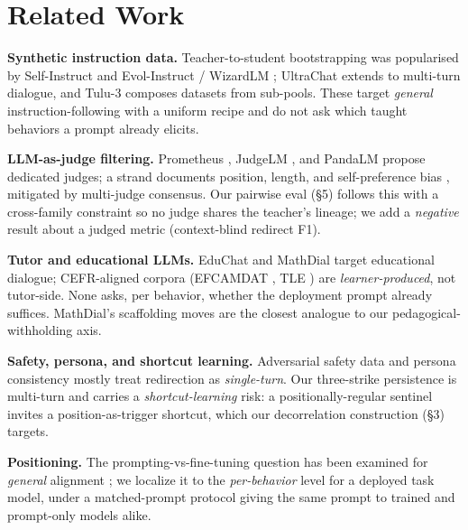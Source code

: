 \section{Related Work}\label{related-work}

\textbf{Synthetic instruction data.} Teacher-to-student bootstrapping
was popularised by Self-Instruct \citep{wang2023selfinstruct} and
Evol-Instruct / WizardLM \citep{xu2023wizardlm}; UltraChat
\citep{ding2023ultrachat} extends to multi-turn dialogue, and Tulu-3
\citep{lambert2024tulu3} composes datasets from sub-pools. These target
\emph{general} instruction-following with a uniform recipe and do not
ask which taught behaviors a prompt already elicits.

\textbf{LLM-as-judge filtering.} Prometheus \citep{kim2024prometheus},
JudgeLM \citep{zhu2023judgelm}, and PandaLM \citep{wang2023pandalm}
propose dedicated judges; a strand documents position, length, and
self-preference bias
\citep{saito2023verbosity, panickssery2024selfpreference}, mitigated by
multi-judge consensus. Our pairwise eval (§5) follows this with a
cross-family constraint so no judge shares the teacher's lineage; we add
a \emph{negative} result about a judged metric (context-blind redirect
F1).

\textbf{Tutor and educational LLMs.} EduChat \citep{dan2023educhat} and
MathDial \citep{macina2023mathdial} target educational dialogue;
CEFR-aligned corpora (EFCAMDAT \citep{geertzen2014efcamdat}, TLE
\citep{berzak2016tle}) are \emph{learner-produced}, not tutor-side. None
asks, per behavior, whether the deployment prompt already suffices.
MathDial's scaffolding moves are the closest analogue to our
pedagogical-withholding axis.

\textbf{Safety, persona, and shortcut learning.} Adversarial safety data
\citep{parrish2022bbq, mazeika2024harmbench, zou2023advbench} and
persona consistency \citep{zhang2018personas, deshpande2023toxicity}
mostly treat redirection as \emph{single-turn}. Our three-strike
persistence is multi-turn and carries a \emph{shortcut-learning}
\citep{geirhos2020shortcut, mccoy2019hans} risk: a positionally-regular
sentinel invites a position-as-trigger shortcut, which our decorrelation
construction (§3) targets.

\textbf{Positioning.} The prompting-vs-fine-tuning question has been
examined for \emph{general} alignment
\citep{zhou2023lima, ouyang2022instructgpt, min2022rethinking}; we
localize it to the \emph{per-behavior} level for a deployed task model,
under a matched-prompt protocol giving the same prompt to trained and
prompt-only models alike.
